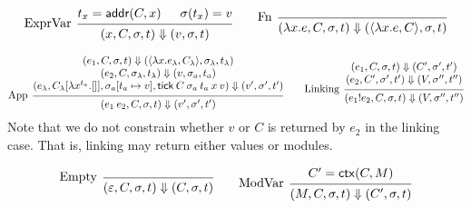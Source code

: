 \documentclass{article}
\theoremstyle{definition}
\newcommand*{\link}[2]{{#1}\mathtt{!}{#2}}
\newcommand*{\addr}{\mathsf{addr}}
\newcommand*{\tick}{\mathsf{tick}}
\newcommand*{\modctx}{\mathsf{ctx}}
\begin{document}
\[
  \begin{prooftree}
    \hypo{t_{x}=\addr(C,x)}
    \hypo{\sigma(t_{x}) = v}
    \infer[left label=ExprVar]2{
    (x, C, \sigma, t)
    \Downarrow
    (v, \sigma, t)
    }
  \end{prooftree}\qquad
  \begin{prooftree}
    \infer[left label=Fn]0{
    (\lambda x.e, C, \sigma, t)
    \Downarrow
    (\langle\lambda x.e, C\rangle, \sigma, t)
    }
  \end{prooftree}
\]

\[
  \begin{prooftree}
    \hypo{
      \begin{matrix}
        (e_{1}, C, \sigma, t)
        \Downarrow
        (\langle\lambda x.e_{\lambda}, C_{\lambda}\rangle, \sigma_{\lambda}, t_{\lambda}) \\
        (e_{2}, C, \sigma_{\lambda}, t_{\lambda})
        \Downarrow
        (v, \sigma_{a}, t_{a})                                                            \\
        (e_{\lambda}, C_{\lambda}[\lambda x^{t_{a}}.[]], \sigma_{a}[t_{a}\mapsto v], \tick\:C\:\sigma_{a}\:t_{a}\:x\:v)
        \Downarrow
        (v', \sigma',t')
      \end{matrix}
    }
    \infer[left label={App}]1{
    (e_{1}\:e_{2}, C, \sigma, t)
    \Downarrow
    (v', \sigma',t')
    }
  \end{prooftree}\qquad
  \begin{prooftree}
    \hypo{
      \begin{matrix}
        (e_{1}, C, \sigma, t)
        \Downarrow
        (C', \sigma', t') \\
        (e_{2}, C', \sigma', t')
        \Downarrow
        (V, \sigma'', t'')
      \end{matrix}
    }
    \infer[left label=Linking]1{
    (\link{e_{1}}{e_{2}}, C, \sigma, t)
    \Downarrow
    (V, \sigma'', t'')
    }
  \end{prooftree}
\]
Note that we do not constrain whether $v$ or $C$ is returned by $e_{2}$ in the linking case.
That is, linking may return either values or modules.

\[
  \begin{prooftree}
    \infer[left label=Empty]0{
    (\varepsilon, C, \sigma, t)
    \Downarrow
    (C, \sigma, t)
    }
  \end{prooftree}\qquad
  \begin{prooftree}
    \hypo{C'=\modctx(C,M)}
    \infer[left label=ModVar]1{
    (M, C, \sigma, t)
    \Downarrow
    (C', \sigma, t)
    }
  \end{prooftree}
\]
\end{document}
